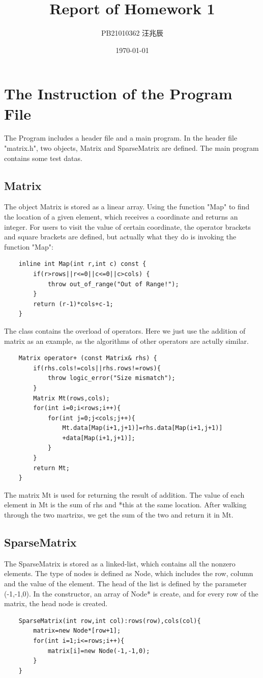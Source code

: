 \documentclass[12pt]{article}
\title{Report of Homework 1}
\author{PB21010362 汪兆辰}
\date{\today}
\begin{document}
\maketitle

\section{The Instruction of the Program File}
The Program includes a header file and a main program. In the header file "matrix.h", two objects, Matrix and SparseMatrix are defined.
The main program contains some test datas.

\subsection{Matrix}
The object Matrix is stored as a linear array. Using the function "Map" to find the location of a given element, which receives a coordinate and returns an integer. 
For users to visit the value of certain coordinate, the operator brackets and square brackets are defined, but actually what they do is invoking the function "Map":
\begin{lstlisting}
    inline int Map(int r,int c) const {
        if(r>rows||r<=0||c<=0||c>cols) { 
            throw out_of_range("Out of Range!");
        }
        return (r-1)*cols+c-1;
    }
\end{lstlisting}

The class contains the overload of operators. Here we just use the addition of matrix as an example, as the algorithms of other operators are actully similar. 
\begin{lstlisting}
    Matrix operator+ (const Matrix& rhs) {
        if(rhs.cols!=cols||rhs.rows!=rows){
            throw logic_error("Size mismatch");
        }
        Matrix Mt(rows,cols);
        for(int i=0;i<rows;i++){
            for(int j=0;j<cols;j++){
                Mt.data[Map(i+1,j+1)]=rhs.data[Map(i+1,j+1)]
                +data[Map(i+1,j+1)];
            }
        }
        return Mt;
    }
\end{lstlisting}
The matrix Mt is used for returning the result of addition. The value of each element in Mt is the sum of rhs and *this at the same location. After walking through the two martrixs, we get the sum 
of the two and return it in Mt.

\subsection{SparseMatrix}
The SparseMatrix is stored as a linked-list, which contains all the nonzero elements. The type of nodes is defined as Node, which includes the row, column and the value of the element. The head of the list is defined by the parameter {(-1,-1,0)}. 
In the constructor, an array of Node* is create, and for every row of the matrix, the head node is created.
\begin{lstlisting}
    SparseMatrix(int row,int col):rows(row),cols(col){
        matrix=new Node*[row+1];
        for(int i=1;i<=rows;i++){
            matrix[i]=new Node(-1,-1,0);
        }
    }
\end{lstlisting}
\end{document}
